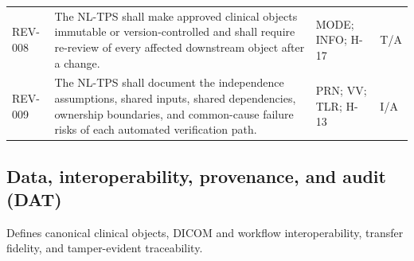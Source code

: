 \documentclass[11pt,letterpaper]{article}
\begin{document}
\begin{small}
\begin{longtable}{@{}L{0.0806\textwidth}L{0.5386\textwidth}L{0.1868\textwidth}L{0.1140\textwidth}@{}}
\addlinespace[2pt]
REV-008 & The NL-TPS shall make approved clinical objects immutable or version-controlled and shall require re-review of every affected downstream object after a change. & MODE; INFO; H-17 & T\slash\allowbreak{}A \\
\addlinespace[2pt]
REV-009 & The NL-TPS shall document the independence assumptions, shared inputs, shared dependencies, ownership boundaries, and common-cause failure risks of each automated verification path. & PRN; VV; TLR; H-13 & I\slash\allowbreak{}A \\
\end{longtable}
\end{small}

\subsection{Data, interoperability, provenance, and audit (DAT)}

Defines canonical clinical objects, DICOM and workflow interoperability, transfer fidelity, and tamper-evident traceability.
\end{document}
